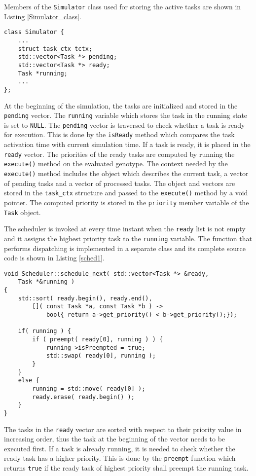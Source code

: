 Members of the \texttt{Simulator} class used for storing the active tasks are shown in Listing \ref{Simulator_class}.
\begin{lstlisting}[frame=none, label={Simulator_class}, caption={Members of \texttt{Simulator} class which store the active tasks.}, captionpos=b]
class Simulator {
	...
    struct task_ctx tctx;
	std::vector<Task *> pending;
	std::vector<Task *> ready;
	Task *running;
	...
};
\end{lstlisting}
At the beginning of the simulation, the tasks are initialized and stored in the \texttt{pending} vector.
The \texttt{running} variable which stores the task in the running state is set to \texttt{NULL}.
The \texttt{pending} vector is traversed to check whether a task is ready for execution.
This is done by the \texttt{isReady} method which compares the task activation time with current simulation time.
If a task is ready, it is placed in the \texttt{ready} vector.
The priorities of the ready tasks are computed by running the \texttt{execute()} method on the evaluated genotype.
The context needed by the \texttt{execute()} method includes the object which describes the current task, a vector of pending tasks and a vector of processed tasks.
The object and vectors are stored in the \texttt{task\_ctx} structure and passed to the \texttt{execute()} method by a void pointer.
The computed priority is stored in the \texttt{priority} member variable of the \texttt{Task} object.

The scheduler is invoked at every time instant when the \texttt{ready} list is not empty and it assigns the highest priority task to the \texttt{running} variable.
The function that performs dispatching is implemented in a separate class and its complete source code is shown in Listing \ref{sched1}.
\newline
\begin{lstlisting}[frame=none, label={sched1}, caption={The \texttt{schedule\_next} method.}, captionpos=b]
void Scheduler::schedule_next( std::vector<Task *> &ready, 
	Task *&running )
{
    std::sort( ready.begin(), ready.end(),
        []( const Task *a, const Task *b ) -> 
            bool{ return a->get_priority() < b->get_priority();});

    if( running ) {
        if ( preempt( ready[0], running ) ) {
            running->isPreempted = true;
            std::swap( ready[0], running );
        }
    }
    else {
        running = std::move( ready[0] );
        ready.erase( ready.begin() );
    }
}
\end{lstlisting}
The tasks in the \texttt{ready} vector are sorted with respect to their priority value in increasing order, thus the task at the beginning of the vector needs to be executed first.
If a task is already running, it is needed to check whether the ready task has a higher priority.
This is done by the \texttt{preempt} function which returns \texttt{true} if the ready task of highest priority shall preempt the running task.

